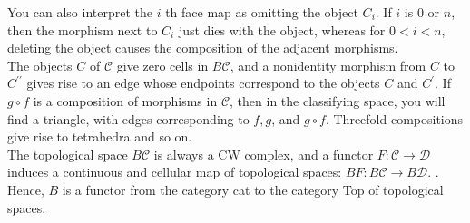 You can also interpret the $i$ th face map as omitting the object $C_i$. If $i$ is 0 or $n$, then the morphism next to $C_i$ just dies with the object, whereas for $0<i<n$, deleting the object causes the composition of the adjacent morphisms.\\

The objects $C$ of $\mathcal{C}$ give zero cells in $B \mathcal{C}$, and a nonidentity morphism from $C$ to $C^{\prime \prime}$ gives rise to an edge whose endpoints correspond to the objects $C$ and $C^{\prime}$. If $g \circ f$ is a composition of morphisms in $\mathcal{C}$, then in the classifying space, you will find a triangle, with edges corresponding to $f, g$, and $g \circ f$. Threefold compositions give rise to tetrahedra and so on.\\
The topological space $B \mathcal{C}$ is always a $\mathrm{CW}$ complex, and a functor $F: \mathcal{C} \rightarrow \mathcal{D}$ induces a continuous and cellular map of topological spaces:
$
B F: B \mathcal{C} \rightarrow B \mathcal{D} \text {. }
$.\\

Hence, $B$ is a functor from the category cat to the category Top of topological spaces.


